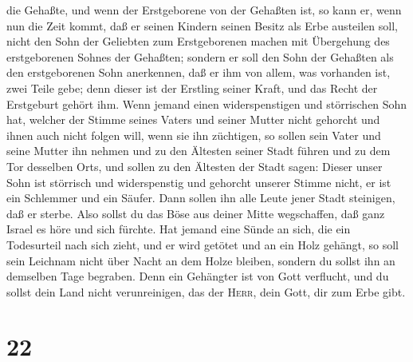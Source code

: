 die Gehaßte, und wenn der Erstgeborene von der Gehaßten ist, so kann er,
 wenn nun die Zeit kommt, daß er seinen Kindern seinen
Besitz als Erbe austeilen soll, nicht den Sohn der Geliebten zum
Erstgeborenen machen mit Übergehung des erstgeborenen Sohnes der
Gehaßten;  sondern er soll den Sohn der Gehaßten als den
erstgeborenen Sohn anerkennen, daß er ihm von allem, was vorhanden ist,
zwei Teile gebe; denn dieser ist der Erstling seiner Kraft, und das
Recht der Erstgeburt gehört ihm.  Wenn jemand einen
widerspenstigen und störrischen Sohn hat, welcher der Stimme seines
Vaters und seiner Mutter nicht gehorcht und ihnen auch nicht folgen
will, wenn sie ihn züchtigen,  so sollen sein Vater und
seine Mutter ihn nehmen und zu den Ältesten seiner Stadt führen und zu
dem Tor desselben Orts,  und sollen zu den Ältesten der
Stadt sagen: Dieser unser Sohn ist störrisch und widerspenstig und
gehorcht unserer Stimme nicht, er ist ein Schlemmer und ein Säufer.
 Dann sollen ihn alle Leute jener Stadt steinigen, daß er
sterbe. Also sollst du das Böse aus deiner Mitte wegschaffen, daß ganz
Israel es höre und sich fürchte.  Hat jemand eine Sünde
an sich, die ein Todesurteil nach sich zieht, und er wird getötet und an
ein Holz gehängt,  so soll sein Leichnam nicht über Nacht
an dem Holze bleiben, sondern du sollst ihn an demselben Tage begraben.
Denn ein Gehängter ist von Gott verflucht, und du sollst dein Land nicht
verunreinigen, das der \textsc{Herr}, dein Gott, dir zum Erbe gibt.

\hypertarget{section-21}{%
\section{22}\label{section-21}}

